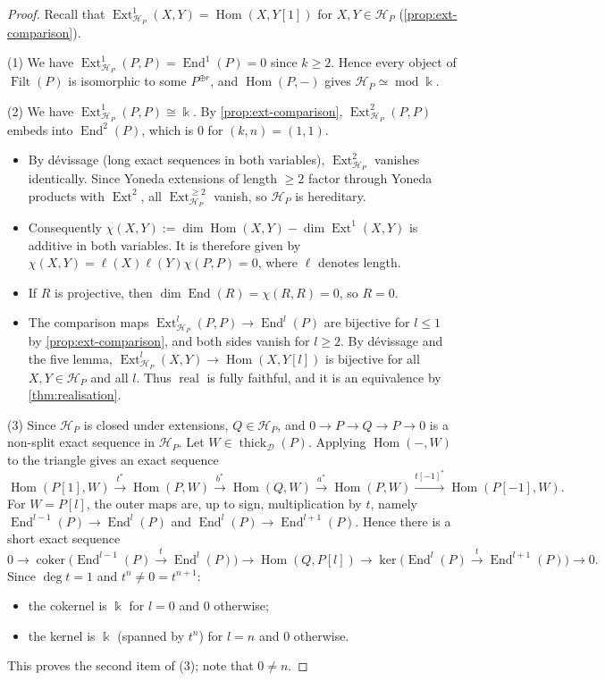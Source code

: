 \documentclass[11pt,reqno]{amsart}
\theoremstyle{plain}
\theoremstyle{definition}
\theoremstyle{remark}
\newcommand{\kk}{\Bbbk}
\DeclareMathOperator{\Hom}{Hom}
\DeclareMathOperator{\End}{End}
\DeclareMathOperator{\Ext}{Ext}
\DeclareMathOperator{\Filt}{Filt}
\DeclareMathOperator{\real}{real}
\newcommand{\modd}{\operatorname{mod}}
\newcommand{\thick}[2][\cD]{\operatorname{thick}_{#1}(#2)}
\newcommand{\cD}{\mathcal{D}}
\newcommand{\cH}{\mathcal{H}}
\begin{document}
\begin{proof}
Recall that $\Ext^1_{\cH_P}(X,Y)=\Hom(X,Y[1])$ for $X,Y\in\cH_P$ (\cref{prop:ext-comparison}).

(1) We have $\Ext^1_{\cH_P}(P,P)=\End^1(P)=0$ since $k\ge2$. Hence every object of $\Filt(P)$ is isomorphic to some $P^{\oplus r}$, and $\Hom(P,-)$ gives $\cH_P\simeq\modd\kk$.

(2) We have $\Ext^1_{\cH_P}(P,P)\cong\kk$. By \cref{prop:ext-comparison}, $\Ext^2_{\cH_P}(P,P)$ embeds into $\End^2(P)$, which is $0$ for $(k,n)=(1,1)$.
\begin{itemize}
\item By d\'evissage (long exact sequences in both variables), $\Ext^2_{\cH_P}$ vanishes identically. Since Yoneda extensions of length $\ge2$ factor through Yoneda products with $\Ext^2$, all $\Ext^{\ge2}_{\cH_P}$ vanish, so $\cH_P$ is hereditary.
\item Consequently $\chi(X,Y):=\dim\Hom(X,Y)-\dim\Ext^1(X,Y)$ is additive in both variables. It is therefore given by $\chi(X,Y)=\ell(X)\ell(Y)\chi(P,P)=0$, where $\ell$ denotes length.
\item If $R$ is projective, then $\dim\End(R)=\chi(R,R)=0$, so $R=0$.
\item The comparison maps $\Ext^l_{\cH_P}(P,P)\to\End^l(P)$ are bijective for $l\le1$ by \cref{prop:ext-comparison}, and both sides vanish for $l\ge2$. By d\'evissage and the five lemma, $\Ext^l_{\cH_P}(X,Y)\to\Hom(X,Y[l])$ is bijective for all $X,Y\in\cH_P$ and all $l$. Thus $\real$ is fully faithful, and it is an equivalence by \cref{thm:realisation}.
\end{itemize}

(3) Since $\cH_P$ is closed under extensions, $Q\in\cH_P$, and $0\to P\to Q\to P\to0$ is a non-split exact sequence in $\cH_P$. Let $W\in\thick P$. Applying $\Hom(-,W)$ to the triangle gives an exact sequence
\[\Hom(P[1],W)\xrightarrow{t^*}\Hom(P,W)\xrightarrow{b^*}\Hom(Q,W)\xrightarrow{a^*}\Hom(P,W)\xrightarrow{t[-1]^*}\Hom(P[-1],W).\]
For $W=P[l]$, the outer maps are, up to sign, multiplication by $t$, namely $\End^{l-1}(P)\to\End^l(P)$ and $\End^l(P)\to\End^{l+1}(P)$. Hence there is a short exact sequence
\[0\to\operatorname{coker}\big(\End^{l-1}(P)\xrightarrow{t}\End^l(P)\big)\to\Hom(Q,P[l])\to\ker\big(\End^l(P)\xrightarrow{t}\End^{l+1}(P)\big)\to0.\]
Since $\deg t=1$ and $t^n\ne0=t^{n+1}$:
\begin{itemize}
\item the cokernel is $\kk$ for $l=0$ and $0$ otherwise;
\item the kernel is $\kk$ (spanned by $t^n$) for $l=n$ and $0$ otherwise.
\end{itemize}
This proves the second item of (3); note that $0\neq n$.


\end{proof}
\end{document}
